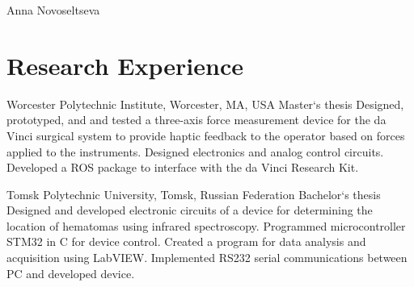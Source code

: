 \documentclass[10pt]{article} %
\begin{document}
\begin{paracol}{2} %


\parbox[top][0.12\textheight][c]{\linewidth}{ %
	\vspace{-0.04\textheight} %
	\centering %
	{\sffamily\Huge Anna Novoseltseva}\\\medskip %
}


\section{Research Experience}

{} %
{Worcester Polytechnic Institute, Worcester, MA, USA} %
{Master`s thesis} %
{Designed, prototyped, and and tested a three-axis force measurement device for the da Vinci surgical system to provide haptic feedback to the operator based on forces applied to the instruments. Designed electronics and analog control circuits. Developed a ROS package to interface with the da Vinci Research Kit.} %


{}
{Tomsk Polytechnic University, Tomsk, Russian Federation} %
{Bachelor`s thesis} %
{Designed and developed electronic circuits of
a device for determining the location of hematomas
using infrared spectroscopy. Programmed microcontroller
STM32 in C for device control. Created
a program for data analysis and acquisition using
LabVIEW. Implemented RS232 serial communications
between PC and developed device.}  %



\end{paracol}
\end{document}
